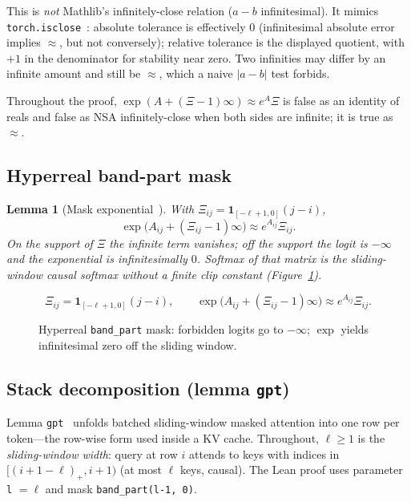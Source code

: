 \documentclass[11pt,a4paper]{article}
\newtheorem{lemma}[theorem]{Lemma}
\newcommand{\XEq}{\approx}
\begin{document}
This is \emph{not} Mathlib's infinitely-close relation ($a-b$ infinitesimal).
It mimics \texttt{torch.isclose}~\cite{pytorch_isclose}:
absolute tolerance is effectively $0$ (infinitesimal absolute error implies $\XEq$, but not conversely);
relative tolerance is the displayed quotient, with $+1$ in the denominator for stability near zero.
Two infinities may differ by an infinite amount and still be $\XEq$, which a naive $|a-b|$ test forbids.

Throughout the proof, $\exp(A+(\Xi-1)\infty)\XEq e^{A}\Xi$ is false as an identity of reals and false as NSA infinitely-close when both sides are infinite; it is true as $\XEq$.

\subsection{Hyperreal band-part mask}

\begin{lemma}[Mask exponential~\cite{lemma_gpt}]
\label{lem:mask}
With $\Xi_{ij}=\mathbf{1}_{[-\ell+1,0]}(j-i)$,
\[
\exp\bigl(A_{ij}+(\Xi_{ij}-1)\infty\bigr)\XEq e^{A_{ij}}\Xi_{ij}.
\]
On the support of $\Xi$ the infinite term vanishes; off the support the logit is $-\infty$ and the exponential is infinitesimally $0$.
Softmax of that matrix is the sliding-window causal softmax without a finite clip constant (Figure~\ref{fig:mask}).
\end{lemma}

\begin{figure}[ht]
\centering
\[
\Xi_{ij}=\mathbf{1}_{[-\ell+1,0]}(j-i),\qquad
\exp\bigl(A_{ij}+(\Xi_{ij}-1)\infty\bigr)\XEq e^{A_{ij}}\Xi_{ij}.
\]
\caption{Hyperreal \texttt{band\_part} mask: forbidden logits go to $-\infty$; $\exp$ yields infinitesimal zero off the sliding window.}
\label{fig:mask}
\end{figure}

\subsection{Stack decomposition (lemma \texttt{gpt})}

Lemma \texttt{gpt}~\cite{lemma_gpt} unfolds batched sliding-window masked attention into one row per token---the row-wise form used inside a KV cache.
Throughout, $\ell\ge 1$ is the \emph{sliding-window width}: query at row $i$ attends to keys with indices in $[(i+1-\ell)_+,i+1)$ (at most $\ell$ keys, causal).
The Lean proof uses parameter \texttt{l} $=\ell$ and mask \texttt{band\_part(l-1, 0)}.
\end{document}
